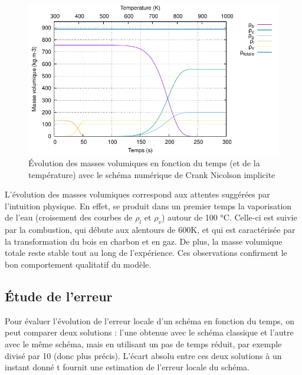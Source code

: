 \documentclass[a4paper,11pt]{article}
\begin{document}
\begin{figure}[H]
    \centering
    \includegraphics[width=0.95\linewidth]{images/densite_CK2.pdf}
    \caption{Évolution des masses volumiques en fonction du temps (et de la température) avec le schéma numérique de Crank Nicolson implicite }
    \label{fig:densiteCK2}
\end{figure}

L'évolution des masses volumiques correspond aux attentes suggérées par l'intuition physique. En effet, se produit dans un premier temps la vaporisation de l'eau (croisement des courbes de $\rho_l$ et $\rho_v$) autour de 100 °C. Celle-ci est suivie par la combustion, qui débute aux alentours de 600K, et qui est caractérisée par la transformation du bois en charbon et en gaz. De plus, la masse volumique totale reste stable tout au long de l'expérience. Ces observations confirment le bon comportement qualitatif du modèle.

\subsection{Étude de l'erreur}

Pour évaluer l'évolution de l'erreur locale d'un schéma en fonction du temps, on peut comparer deux solutions : l'une obtenue avec le schéma classique et l'autre avec le même schéma, mais en utilisant un pas de temps réduit, par exemple divisé par 10 (donc plus précis). L'écart absolu entre ces deux solutions à un instant donné t fournit une estimation de l'erreur locale du schéma.
\end{document}
